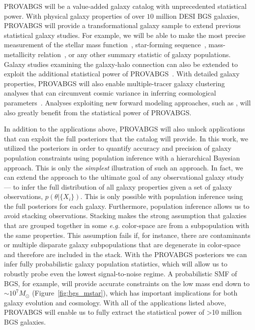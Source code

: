 {\sc PROVABGS} will be a value-added galaxy catalog with unprecedented
statistical power. 
With physical galaxy properties of over $10$ million DESI BGS galaxies, 
{\sc PROVABGS} will provide a transformational galaxy sample to extend
previous statistical galaxy studies. 
For example, we will be able to make the most precise measurement of the
stellar mass function~\citep[SMF]{li2009, moustakas2013}, star-forming
sequence~\citep{noeske2007}, mass-metallicity relation~\citep{tremonti2004}, or
any other summary statistic of galaxy populations. 
Galaxy studies examining the galaxy-halo connection can also be extended to
exploit the additional statistical power of {\sc
PROVABGS}~\citep[\emph{e.g.}][]{tinker2011, wetzel2013, zu2015, hahn2017,
hahn2019b}. 
With detailed galaxy properties, {\sc PROVABGS} will also enable
multiple-tracer galaxy clustering analyses that can circumvent cosmic variance
in inferring cosmological parameters~\citep{seljak2009, mcdonald2009,
wang2020}.
Analyses exploiting new forward modeling approaches, such as \cite{hahn2021},
will also greatly benefit from the statistical power of {\sc PROVABGS}.

In addition to the applications above, {\sc PROVABGS} will also unlock
applications that can exploit the full posteriors that the catalog will
provide. 
In this work, we utilized the posteriors in order to quantify accuracy and
precision of galaxy population constraints using population inference with a
hierarchical Bayesian approach. 
This is only the \emph{simplest} illustration of such an approach. 
In fact, we can extend the approach to the ultimate goal of any observational
galaxy study --- to infer the full distribution of all galaxy properties given
a set of galaxy observations, $p(\theta | \{X_i\})$.
This is only possible with population inference using the full posteriors for
each galaxy.
Furthermore, population inference allows us to avoid stacking observations. 
Stacking makes the strong assumption that galaxies that are grouped together in
some \emph{e.g.} color-space are from a subpopulation with the same properties. 
This assumption fails if, for instance, there are contaminants or multiple
disparate galaxy subpopulations that are degenerate in color-space and
therefore are included in the stack. 
With the {\sc PROVABGS} posteriors we can infer fully probabilistic galaxy
population statistics, which will allow us to robustly probe even the lowest
signal-to-noise regime.
A probabilistic SMF of BGS, for example, will provide accurate constraints on
the low mass end down to ${\sim}10^{7} M_\odot$ (Figure~\ref{fig:bgs_mstar}),
which has important implications for both galaxy evolution and cosmology. 
With all of the applications listed above, {\sc PROVABGS} will enable us to
fully extract the statistical power of >10 million BGS galaxies.
